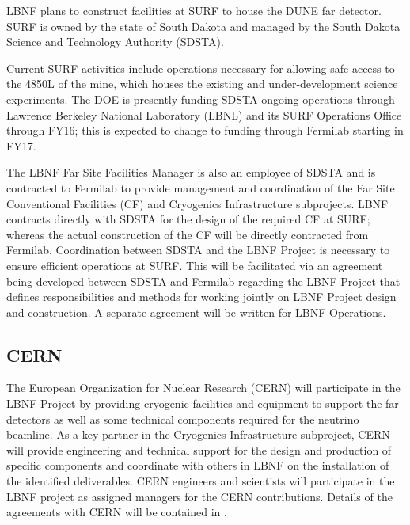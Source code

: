 LBNF plans to construct facilities at SURF to house the DUNE far detector. SURF is owned by the state of South Dakota and managed by the South Dakota Science and Technology Authority (SDSTA). 

Current SURF activities include operations necessary for allowing safe access to the 4850L of the mine, which houses the existing and under-development science experiments. The DOE is presently funding SDSTA ongoing operations through Lawrence Berkeley National Laboratory (LBNL) and its SURF Operations Office through FY16; this is expected to change to funding through Fermilab starting in FY17. 

The LBNF Far Site Facilities Manager is also an employee of SDSTA and is contracted to Fermilab to provide management and coordination of the Far Site Conventional Facilities (CF) and Cryogenics Infrastructure subprojects. LBNF contracts directly with SDSTA for the design of the required CF at SURF; whereas the actual construction of the CF will be directly contracted from Fermilab. Coordination between SDSTA and the LBNF Project is necessary to ensure efficient operations at SURF. This will be facilitated via an agreement being developed between SDSTA and Fermilab regarding the LBNF Project  that defines responsibilities and methods for working jointly on LBNF Project design and construction. A separate agreement will be written for LBNF Operations. 

\subsection{CERN}

The European Organization for Nuclear Research (CERN) will participate in the LBNF Project by providing cryogenic facilities and equipment to support the far detectors as well as some technical components required for the neutrino beamline. As a key partner in the Cryogenics Infrastructure subproject, CERN will provide engineering and technical support for the design and production of specific components and coordinate with others in LBNF on the installation of the identified deliverables. CERN engineers and scientists will participate in the LBNF project as assigned managers for the CERN contributions.
Details of the agreements with CERN will be contained in .  

